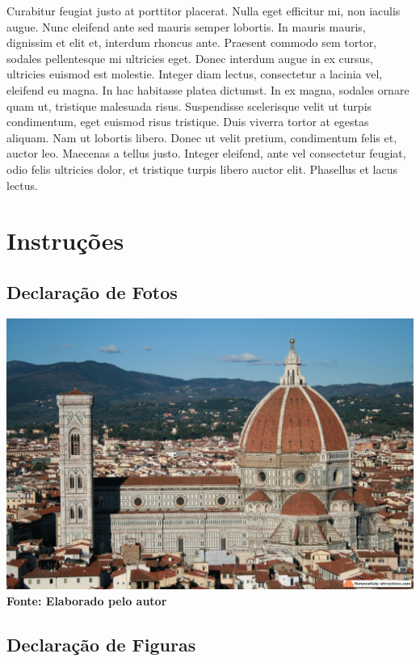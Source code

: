 					Curabitur feugiat justo at porttitor placerat. Nulla eget efficitur mi, non iaculis augue. Nunc eleifend ante sed mauris semper lobortis. In mauris mauris, dignissim et elit et, interdum rhoncus ante. Praesent commodo sem tortor, sodales pellentesque mi ultricies eget. Donec interdum augue in ex cursus, ultricies euismod est molestie. Integer diam lectus, consectetur a lacinia vel, eleifend eu magna. In hac habitasse platea dictumst. In ex magna, sodales ornare quam ut, tristique malesuada risus. Suspendisse scelerisque velit ut turpis condimentum, eget euismod risus tristique. Duis viverra tortor at egestas aliquam. Nam ut lobortis libero. Donec ut velit pretium, condimentum felis et, auctor leo. Maecenas a tellus justo. Integer eleifend, ante vel consectetur feugiat, odio felis ultricies dolor, et tristique turpis libero auctor elit. Phasellus et lacus lectus. 


\chapter{Instruções}\label{section:2}
	
	\section{\esp Declaração de Fotos}\label{section:2.1}

		\begin{center}
			\centering	
			\includegraphics[width=.8\textwidth, height=.5\textwidth]{midias/foto.jpg}
			\\
			\textbf{\footnotesize Fonte: Elaborado pelo autor}
			\label{foto1}
		\end{center}
	
	\section{\esp Declaração de Figuras}\label{section:2.1}
		

